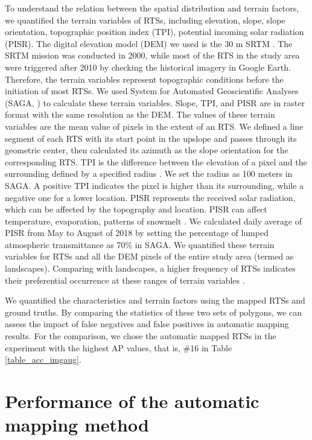 \documentclass[preprint,12pt,authoryear]{elsarticle}
\begin{document}
To understand the relation between the spatial distribution and terrain factors, we quantified the terrain variables of RTSs, including elevation, slope, slope orientation, topographic position index (TPI), potential incoming solar radiation (PISR). The digital elevation model (DEM) we used is the 30 m SRTM \citep{farr2007shuttle}. The SRTM mission was conducted in 2000, while most of the RTS in the study area were triggered after 2010 by checking the historical imagery in Google Earth. Therefore, the terrain variables represent topographic conditions before the initiation of most RTSs. We used System for Automated Geoscientific Analyses (SAGA, \citealp{conrad2015system}) to calculate these terrain variables. Slope, TPI, and PISR are in raster format with the same resolution as the DEM. The values of these terrain variables are the mean value of pixels in the extent of an RTS. We defined a line segment of each RTS with its start point in the upslope and passes through its geometric center, then calculated its azimuth as the slope orientation for the corresponding RTS. TPI is the difference between the elevation of a pixel and the surrounding defined by a specified radius \citep{guisan1999glm, reu2013application}. We set the radius as 100 meters in SAGA. A positive TPI indicates the pixel is higher than its surrounding, while a negative one for a lower location. PISR represents the received solar radiation, which can be affected by the topography and location. PISR can affect temperature, evaporation, patterns of snowmelt \citep{bohner2009land}. We calculated daily average of PISR from May to August of 2018 by setting the percentage of lumped atmospheric transmittance as 70\% in SAGA. We quantified these terrain variables for RTSs and all the DEM pixels of the entire study area (termed as landscapes). Comparing with landscapes, a higher frequency of RTSs indicates their preferential occurrence at these ranges of terrain variables \citep{lacelle_distribution_2015}. 

We quantified the characteristics and terrain factors using the mapped RTSs and ground truths. By comparing the statistics of these two sets of polygons, we can assess the impact of false negatives and false positives in automatic mapping results. For the comparison, we chose the automatic mapped RTSs in the experiment with the highest AP values, that is, \#16 in Table \ref{table_acc_imgaug}.  


\section{Performance of the automatic mapping method}
\label{sec_performance}
\end{document}
